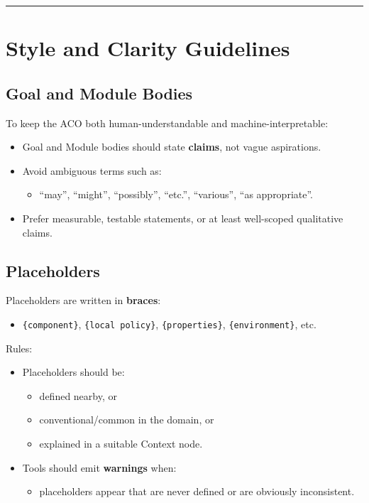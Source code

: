 \documentclass[11pt]{article}
\begin{document}
\bigskip
\hrule
\bigskip

\section{Style and Clarity Guidelines}

\subsection{Goal and Module Bodies}

To keep the ACO both human-understandable and machine-interpretable:
\begin{itemize}[leftmargin=2em]
  \item Goal and Module bodies should state \textbf{claims}, not vague aspirations.
  \item Avoid ambiguous terms such as:
  \begin{itemize}[leftmargin=1.5em]
    \item ``may'', ``might'', ``possibly'', ``etc.'', ``various'', ``as appropriate''.
  \end{itemize}
  \item Prefer measurable, testable statements, or at least well-scoped qualitative claims.
\end{itemize}

\subsection{Placeholders}

Placeholders are written in \textbf{braces}:
\begin{itemize}[leftmargin=2em]
  \item \texttt{\{component\}}, \texttt{\{local policy\}}, \texttt{\{properties\}}, \texttt{\{environment\}}, etc.
\end{itemize}

Rules:
\begin{itemize}[leftmargin=2em]
  \item Placeholders should be:
  \begin{itemize}[leftmargin=1.5em]
    \item defined nearby, or
    \item conventional/common in the domain, or
    \item explained in a suitable Context node.
  \end{itemize}
  \item Tools should emit \textbf{warnings} when:
  \begin{itemize}[leftmargin=1.5em]
    \item placeholders appear that are never defined or are obviously inconsistent.
  \end{itemize}
\end{itemize}
\end{document}
